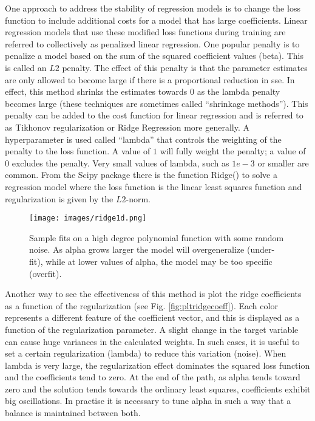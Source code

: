\noindent One approach to address the stability of regression models is to change the loss function to include additional costs for a model that has large coefficients. Linear regression models that use these modified loss functions during training are referred to collectively as penalized linear regression. One popular penalty is to penalize a model based on the sum of the squared coefficient values (beta). This is called an $L2$ penalty. The effect of this penalty is that the parameter estimates are only allowed to become large if there is a proportional reduction in \gls{sse}. In effect, this method shrinks the estimates towards $0$ as the lambda penalty becomes large (these techniques are sometimes called “shrinkage methods”). This penalty can be added to the cost function for linear regression and is referred to as Tikhonov regularization or Ridge Regression more generally. A hyperparameter is used called “lambda” that controls the weighting of the penalty to the loss function. A value of $1$ will fully weight the penalty; a value of $0$ excludes the penalty. Very small values of lambda, such as $1e-3$ or smaller are common. From the Scipy package there is the function Ridge() to solve a regression model where the loss function is the linear least squares function and regularization is given by the $L2$-norm.

\begin{figure}[H]
	\centering
	\texttt{[image: images/ridge1d.png]}
	\caption[Ridge regression 1D.]{Sample fits on a high degree polynomial function with some random noise. As alpha grows larger the model will overgeneralize (under-fit), while at lower values of alpha, the model may be too specific (overfit).}
	\label{fig:ridge1d}
\end{figure}

\noindent Another way to see the effectiveness of this method is plot the ridge coefficients as a function of the regularization (see Fig. \ref{fig:pltridgecoeff}). Each color represents a different feature of the coefficient vector, and this is displayed as a function of the regularization parameter. A slight change in the target variable can cause huge variances in the calculated weights. In such cases, it is useful to set a certain regularization (lambda) to reduce this variation (noise). When lambda is very large, the regularization effect dominates the squared loss function and the coefficients tend to zero. At the end of the path, as alpha tends toward zero and the solution tends towards the ordinary least squares, coefficients exhibit big oscillations. In practise it is necessary to tune alpha in such a way that a balance is maintained between both.

